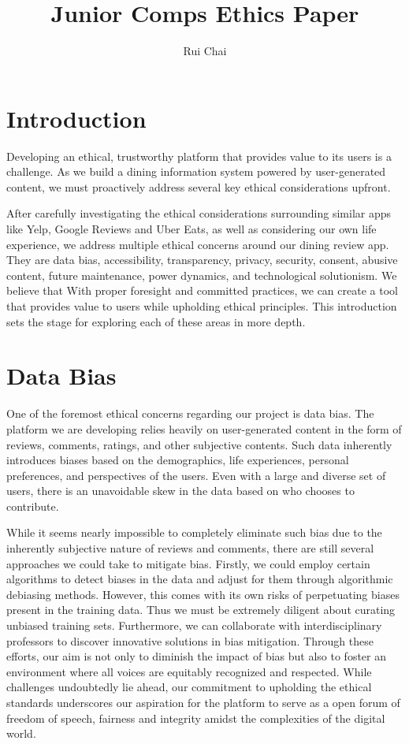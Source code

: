 \documentclass[10pt,twocolumn]{article}
\title{Junior Comps Ethics Paper}
\author{Rui Chai}
\affiliation{Occidental College}
\begin{document}
\maketitle


\section{Introduction}
Developing an ethical, trustworthy platform that provides value to its users is a challenge. As we build a dining information system powered by user-generated content, we must proactively address several key ethical considerations upfront.

After carefully investigating the ethical considerations surrounding similar apps like Yelp, Google Reviews and Uber Eats, as well as considering our own life experience, we address multiple ethical concerns around our dining review app. They are data bias, accessibility, transparency, privacy, security, consent, abusive content, future maintenance, power dynamics, and technological solutionism. We believe that With proper foresight and committed practices, we can create a tool that provides value to users while upholding ethical principles. This introduction sets the stage for exploring each of these areas in more depth.



\section{Data Bias}
One of the foremost ethical concerns regarding our project is data bias. The platform we are developing relies heavily on user-generated content in the form of reviews, comments, ratings, and other subjective contents. Such data inherently introduces biases based on the demographics, life experiences, personal preferences, and perspectives of the users. Even with a large and diverse set of users, there is an unavoidable skew in the data based on who chooses to contribute.

While it seems nearly impossible to completely eliminate such bias due to the inherently subjective nature of reviews and comments, there are still several approaches we could take to mitigate bias. Firstly, we could employ certain algorithms to detect biases in the data and adjust for them through algorithmic debiasing methods. However, this comes with its own risks of perpetuating biases present in the training data. Thus we must be extremely diligent about curating unbiased training sets. Furthermore, we can collaborate with interdisciplinary professors to discover innovative solutions in bias mitigation. Through these efforts, our aim is not only to diminish the impact of bias but also to foster an environment where all voices are equitably recognized and respected. While challenges undoubtedly lie ahead, our commitment to upholding the ethical standards underscores our aspiration for the platform to serve as a open forum of freedom of speech, fairness and integrity amidst the complexities of the digital world. 
\end{document}
